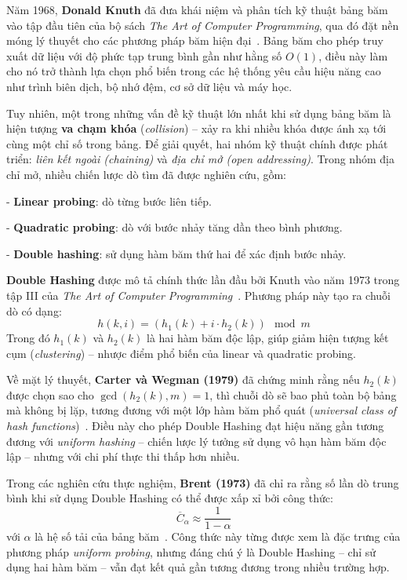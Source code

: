 \documentclass[12pt,a4paper]{report}
\begin{document}
Năm 1968, \textbf{Donald Knuth} đã đưa khái niệm và phân tích kỹ thuật bảng băm vào tập đầu tiên của bộ sách \textit{The Art of Computer Programming}, qua đó đặt nền móng lý thuyết cho các phương pháp băm hiện đại~\cite{knuth1998}. Bảng băm cho phép truy xuất dữ liệu với độ phức tạp trung bình gần như hằng số $O(1)$, điều này làm cho nó trở thành lựa chọn phổ biến trong các hệ thống yêu cầu hiệu năng cao như trình biên dịch, bộ nhớ đệm, cơ sở dữ liệu và máy học.

Tuy nhiên, một trong những vấn đề kỹ thuật lớn nhất khi sử dụng bảng băm là hiện tượng \textbf{va chạm khóa} (\textit{collision}) – xảy ra khi nhiều khóa được ánh xạ tới cùng một chỉ số trong bảng. Để giải quyết, hai nhóm kỹ thuật chính được phát triển: \textit{liên kết ngoài (chaining)} và \textit{địa chỉ mở (open addressing)}. Trong nhóm địa chỉ mở, nhiều chiến lược dò tìm đã được nghiên cứu, gồm:

- \textbf{Linear probing}: dò từng bước liên tiếp.

- \textbf{Quadratic probing}: dò với bước nhảy tăng dần theo bình phương.

- \textbf{Double hashing}: sử dụng hàm băm thứ hai để xác định bước nhảy.

\textbf{Double Hashing} được mô tả chính thức lần đầu bởi Knuth vào năm 1973 trong tập III của \textit{The Art of Computer Programming}~\cite{knuth1998}. Phương pháp này tạo ra chuỗi dò có dạng:
\[
h(k, i) = (h_1(k) + i \cdot h_2(k)) \mod m
\]
Trong đó $h_1(k)$ và $h_2(k)$ là hai hàm băm độc lập, giúp giảm hiện tượng kết cụm (\textit{clustering}) – nhược điểm phổ biến của linear và quadratic probing.

Về mặt lý thuyết, \textbf{Carter và Wegman (1979)} đã chứng minh rằng nếu $h_2(k)$ được chọn sao cho $\gcd(h_2(k), m) = 1$, thì chuỗi dò sẽ bao phủ toàn bộ bảng mà không bị lặp, tương đương với một lớp hàm băm phổ quát (\textit{universal class of hash functions})~\cite{carter1979}. Điều này cho phép Double Hashing đạt hiệu năng gần tương đương với \textit{uniform hashing} – chiến lược lý tưởng sử dụng vô hạn hàm băm độc lập – nhưng với chi phí thực thi thấp hơn nhiều.

Trong các nghiên cứu thực nghiệm, \textbf{Brent (1973)} đã chỉ ra rằng số lần dò trung bình khi sử dụng Double Hashing có thể được xấp xỉ bởi công thức:
\[
\overline{C}_\alpha \approx \frac{1}{1 - \alpha}
\]
với $\alpha$ là hệ số tải của bảng băm~\cite{brent1973}. Công thức này từng được xem là đặc trưng của phương pháp \textit{uniform probing}, nhưng đáng chú ý là Double Hashing – chỉ sử dụng hai hàm băm – vẫn đạt kết quả gần tương đương trong nhiều trường hợp.
\end{document}
